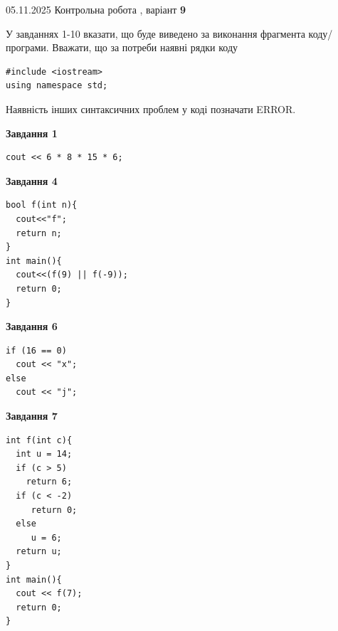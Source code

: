 \documentclass[12pt, ukrainian]{article}
\begin{document}
{\Large{05.11.2025 Контрольна робота , варіант  \No \textbf { 9 }\par}}
{
\begin {large}
У завданнях 1-10 вказати, що буде виведено за виконання фрагмента коду/про\-гра\-ми.
Вважати, що за потреби наявні рядки коду
\begin{verbatim}
#include <iostream>
using namespace std;
\end{verbatim}
Наявність інших синтаксичних проблем у коді позначати ERROR.

\begin{minipage}[t]{7.0cm}

\begin{center}
\textbf{Завдання 1}
\end{center}
\vspace{-8mm}

\begin{verbatim}
cout << 6 * 8 * 15 * 6;
\end{verbatim}



\begin{center}
\textbf{Завдання 4}
\end{center}
\vspace{-8mm}

\begin{verbatim}
bool f(int n){
  cout<<"f";
  return n;
}
int main(){
  cout<<(f(9) || f(-9));
  return 0;
}
\end{verbatim}



\begin{center}
\textbf{Завдання 6}
\end{center}
\vspace{-8mm}

\begin{verbatim}
if (16 == 0)
  cout << "x";
else
  cout << "j";
\end{verbatim}



\begin{center}
\textbf{Завдання 7}
\end{center}
\vspace{-8mm}

\begin{verbatim}
int f(int c){
  int u = 14;
  if (c > 5)
    return 6;
  if (c < -2)
     return 0;
  else
     u = 6;
  return u;
}
int main(){
  cout << f(7);
  return 0;
}
\end{verbatim}


\end{minipage}
\end{large}}
\end{document}
